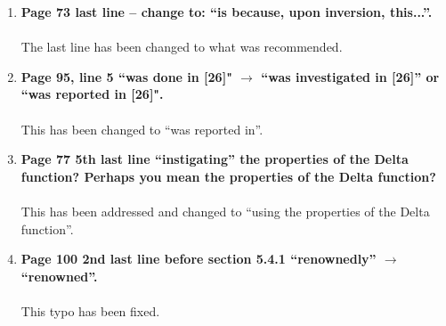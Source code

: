 \documentclass{article}
\begin{document}
\begin{enumerate}
         \item \textbf{Page 73 last line -- change to: ``is because, upon inversion, this...''.
    \\
    \\}
    The last line has been changed to what was recommended.
    
         \item \textbf{Page 95, line 5 ``was done in [26]" $\rightarrow$ ``was investigated in [26]'' or ``was reported in [26]".
    \\
    \\}
    This has been changed to ``was reported in''.
    
         \item \textbf{Page 77 5th last line ``instigating'' the properties of the Delta function? Perhaps you mean the properties of the Delta function?
    \\
    \\}
    This has been addressed and changed to ``using the properties of the Delta function''.
    
         \item \textbf{Page 100 2nd last line before section 5.4.1 ``renownedly'' $\rightarrow$ ``renowned''.
    \\
    \\}
    This typo has been fixed.\\\\\\

\end{enumerate}
\end{document}

